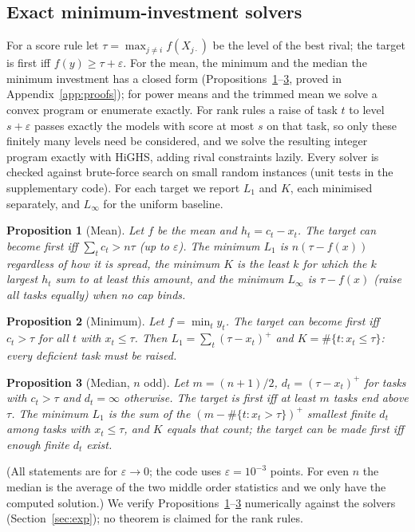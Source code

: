 \documentclass{article}
\newtheorem{proposition}{Proposition}
\begin{document}
\subsection{Exact minimum-investment solvers}
\label{sec:solvers}
For a score rule let $\tau=\max_{j\neq i} f(X_{j\cdot})$ be the level of the best rival; the target is first iff $f(y)\ge \tau+\varepsilon$. For the mean, the minimum and the median the minimum investment has a closed form (Propositions~\ref{prop:mean}--\ref{prop:median}, proved in Appendix~\ref{app:proofs}); for power means and the trimmed mean we solve a convex program or enumerate exactly. For rank rules a raise of task $t$ to level $s+\varepsilon$ passes exactly the models with score at most $s$ on that task, so only these finitely many levels need be considered, and we solve the resulting integer program exactly with HiGHS, adding rival constraints lazily. Every solver is checked against brute-force search on small random instances (unit tests in the supplementary code). For each target we report $L_1$ and $K$, each minimised separately, and $L_\infty$ for the uniform baseline.

\begin{proposition}[Mean]\label{prop:mean}
Let $f$ be the mean and $h_t=c_t-x_t$. The target can become first iff $\sum_t c_t> n\tau$ (up to $\varepsilon$). The minimum $L_1$ is $n(\tau-f(x))$ regardless of how it is spread, the minimum $K$ is the least $k$ for which the $k$ largest $h_t$ sum to at least this amount, and the minimum $L_\infty$ is $\tau-f(x)$ (raise all tasks equally) when no cap binds.
\end{proposition}
\begin{proposition}[Minimum]\label{prop:min}
Let $f=\min_t y_t$. The target can become first iff $c_t>\tau$ for all $t$ with $x_t\le\tau$. Then $L_1=\sum_t(\tau-x_t)^+$ and $K=\#\{t:x_t\le\tau\}$: every deficient task must be raised.
\end{proposition}
\begin{proposition}[Median, $n$ odd]\label{prop:median}
Let $m=(n+1)/2$, $d_t=(\tau-x_t)^+$ for tasks with $c_t>\tau$ and $d_t=\infty$ otherwise. The target is first iff at least $m$ tasks end above $\tau$. The minimum $L_1$ is the sum of the $(m-\#\{t:x_t>\tau\})^+$ smallest finite $d_t$ among tasks with $x_t\le\tau$, and $K$ equals that count; the target can be made first iff enough finite $d_t$ exist.
\end{proposition}
(All statements are for $\varepsilon\to0$; the code uses $\varepsilon=10^{-3}$ points. For even $n$ the median is the average of the two middle order statistics and we only have the computed solution.) We verify Propositions~\ref{prop:mean}--\ref{prop:median} numerically against the solvers (Section~\ref{sec:exp}); no theorem is claimed for the rank rules.
\end{document}
